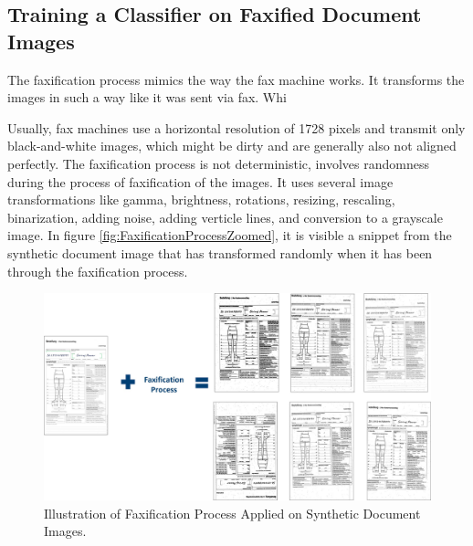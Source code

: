 \subsection{Training a Classifier on Faxified Document Images}\label{trainingfaxifiedclassifier}

The faxification process mimics the way the fax machine works. It transforms the images in such a way like it was sent via fax. Whi


Usually, fax machines use a horizontal resolution of 1728 pixels and transmit only black-and-white images, which might be dirty and are generally also not aligned perfectly. The faxification process is not deterministic, involves randomness during the process of faxification of the images.  It uses several image transformations like gamma, brightness, rotations, resizing, rescaling, binarization, adding noise, adding verticle lines, and conversion to a grayscale image. In figure \ref{fig:FaxificationProcessZoomed}, it is visible a snippet from the synthetic document image that has transformed randomly when it has been through the faxification process. 

\begin{figure}[H]
        \begin{center}
	    \includegraphics[scale=0.25]{images/FaxificationProcess.jpg}
	    \caption[Illustration of Faxification Process Applied on Synthetic Document Images.]{Illustration of Faxification Process Applied on Synthetic Document Images.}
	    \label{fig:FaxificationProcess}
	    \end{center}
\end{figure}



